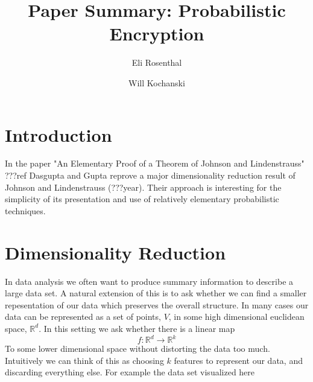 \documentclass[11pt]{article}
\author{Eli Rosenthal \and Will Kochanski}
\date{}
\title{Paper Summary: Probabilistic Encryption}
\newcommand{\arr}{\rightarrow}
\newcommand{\R}{\mathbb{R}}
\begin{document}
\maketitle
\section{Introduction}
In the paper "An Elementary Proof of a Theorem of Johnson and Lindenstrauss" ???ref Dasgupta and Gupta reprove a major dimensionality reduction result of Johnson and Lindenstrauss (???year). Their approach is interesting for the simplicity of its presentation and use of relatively elementary probabilistic techniques.


\section{Dimensionality Reduction}
In data analysis we often want to produce summary information to describe a large data set. A natural extension of this is to ask whether we can find a smaller repesentation of our data which preserves the overall structure. In many cases our data can be represented as a set of points, $V$, in some high dimensional euclidean space, $\R^d$. In this setting we ask whether there is a linear map
\[ f : \R^d \arr \R^k \]
To some lower dimensional space without distorting the data too much. Intuitively we can think of this as choosing $k$ features to represent our data, and discarding everything else. For example the data set visualized here
\end{document}
